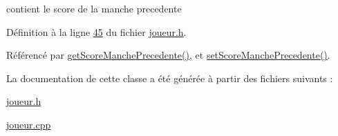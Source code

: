 contient le score de la manche precedente 



Définition à la ligne \hyperlink{joueur_8h_source_l00045}{45} du fichier \hyperlink{joueur_8h_source}{joueur.\+h}.



Référencé par \hyperlink{joueur_8cpp_source_l00057}{get\+Score\+Manche\+Precedente()}, et \hyperlink{joueur_8cpp_source_l00146}{set\+Score\+Manche\+Precedente()}.



La documentation de cette classe a été générée à partir des fichiers suivants \+:\begin{DoxyCompactItemize}
\item 
\hyperlink{joueur_8h}{joueur.\+h}\item 
\hyperlink{joueur_8cpp}{joueur.\+cpp}\end{DoxyCompactItemize}
